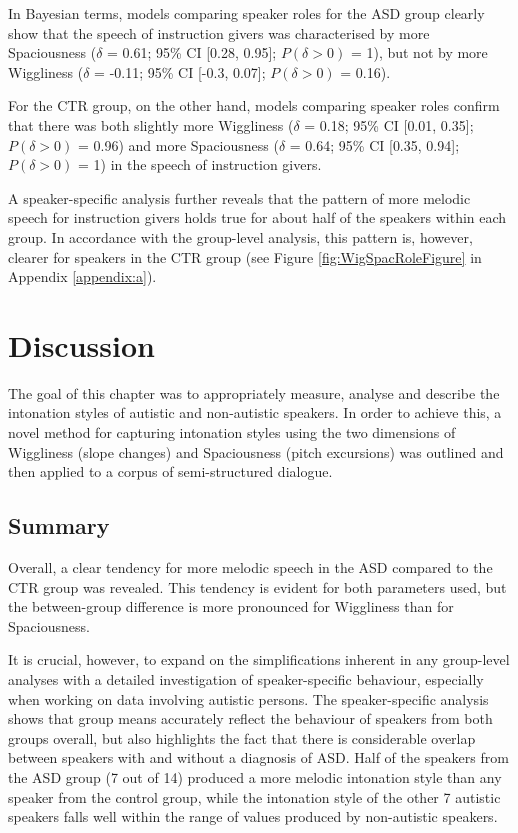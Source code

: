 In Bayesian terms, models comparing speaker roles for the ASD group clearly show that the speech of instruction givers was characterised by more Spaciousness (\(\delta\) = 0.61; 95\% CI {[}0.28, 0.95{]}; \(P(\delta > 0)\) = 1), but not by more Wiggliness (\(\delta\) = -0.11; 95\% CI {[}-0.3, 0.07{]}; \(P(\delta > 0)\) = 0.16).

For the CTR group, on the other hand, models comparing speaker roles confirm that there was both slightly more Wiggliness (\(\delta\) = 0.18; 95\% CI {[}0.01, 0.35{]}; \(P(\delta > 0)\) = 0.96) and more Spaciousness (\(\delta\) = 0.64; 95\% CI {[}0.35, 0.94{]}; \(P(\delta > 0)\) = 1) in the speech of instruction givers.

A speaker-specific analysis further reveals that the pattern of more melodic speech for instruction givers holds true for about half of the speakers within each group. In accordance with the group-level analysis, this pattern is, however, clearer for speakers in the CTR group (see Figure \ref{fig:WigSpacRoleFigure} in Appendix \ref{appendix:a}).





	\section{Discussion}\label{sec:intonation_discussion}

The goal of this chapter was to appropriately measure, analyse and describe the intonation styles of autistic and non-autistic speakers. In order to achieve this, a novel method for capturing intonation styles using the two dimensions of Wiggliness (slope changes) and Spaciousness (pitch excursions) was outlined and then applied to a corpus of semi-structured dialogue.

	\subsection{Summary}\label{int_disc_summary}

Overall, a clear tendency for more melodic speech in the ASD compared to the CTR group was revealed. This tendency is evident for both parameters used, but the between-group difference is more pronounced for Wiggliness than for Spaciousness.

It is crucial, however, to expand on the simplifications inherent in any group-level analyses with a detailed investigation of speaker-specific behaviour, especially when working on data involving autistic persons. The speaker-specific analysis shows that group means accurately reflect the behaviour of speakers from both groups overall, but also highlights the fact that there is considerable overlap between speakers with and without a diagnosis of ASD. Half of the speakers from the ASD group (7 out of 14) produced a more melodic intonation style than any speaker from the control group, while the intonation style of the other 7 autistic speakers falls well within the range of values produced by non-autistic speakers.

